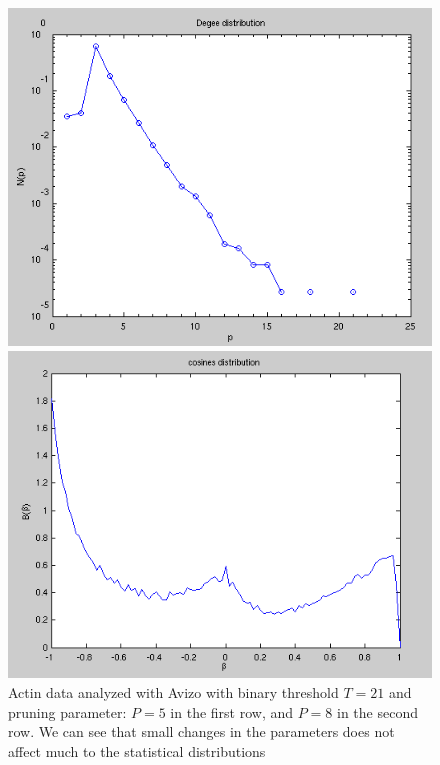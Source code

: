 \begin{figure}[h!]
\begin{minipage}{0.32\textwidth}
\begin{center}
\includegraphics[width=1.0\textwidth]{Figures/chapter-image/avizo/ActinZ39b21l8-histo-degree.png}%
\end{center}
\end{minipage}
\begin{minipage}{0.32\textwidth}
\begin{center}
\includegraphics[width=1.0\textwidth]{Figures/chapter-image/avizo/ActinZ39b21l8-histo-cosines.png}%
\end{center}
\end{minipage}

\caption[Distributions of length, degree, and cosines with Avizo for
actin with T=21,P=5]{Actin data analyzed with Avizo with binary threshold
$T=21$ and pruning parameter: $P=5$ in the first row, and  $P=8$ in the second
row. We can see that small changes in the parameters
does not affect much to the statistical distributions}
\label{fig:avizo_histograms21}
\end{figure}

